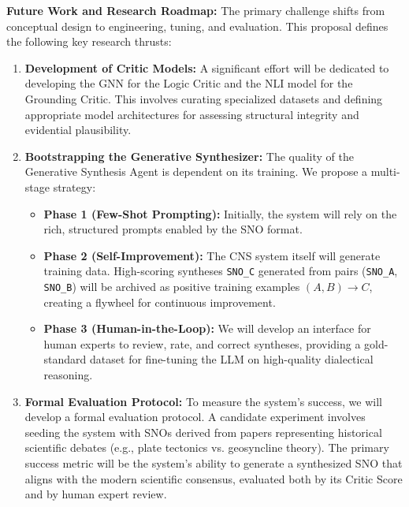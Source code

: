\documentclass[12pt, a4paper]{article}
\begin{document}
\textbf{Future Work and Research Roadmap:} The primary challenge shifts from conceptual design to engineering, tuning, and evaluation. This proposal defines the following key research thrusts:

\begin{enumerate}
    \item \textbf{Development of Critic Models:} A significant effort will be dedicated to developing the GNN for the Logic Critic and the NLI model for the Grounding Critic. This involves curating specialized datasets and defining appropriate model architectures for assessing structural integrity and evidential plausibility.
    
    \item \textbf{Bootstrapping the Generative Synthesizer:} The quality of the Generative Synthesis Agent is dependent on its training. We propose a multi-stage strategy:
        \begin{itemize}
            \item \textbf{Phase 1 (Few-Shot Prompting):} Initially, the system will rely on the rich, structured prompts enabled by the SNO format.
            \item \textbf{Phase 2 (Self-Improvement):} The CNS system itself will generate training data. High-scoring syntheses \texttt{SNO\_C} generated from pairs (\texttt{SNO\_A}, \texttt{SNO\_B}) will be archived as positive training examples $(A, B) \to C$, creating a flywheel for continuous improvement.
            \item \textbf{Phase 3 (Human-in-the-Loop):} We will develop an interface for human experts to review, rate, and correct syntheses, providing a gold-standard dataset for fine-tuning the LLM on high-quality dialectical reasoning.
        \end{itemize}

    \item \textbf{Formal Evaluation Protocol:} To measure the system's success, we will develop a formal evaluation protocol. A candidate experiment involves seeding the system with SNOs derived from papers representing historical scientific debates (e.g., plate tectonics vs. geosyncline theory). The primary success metric will be the system's ability to generate a synthesized SNO that aligns with the modern scientific consensus, evaluated both by its Critic Score and by human expert review.
\end{enumerate}
\end{document}
